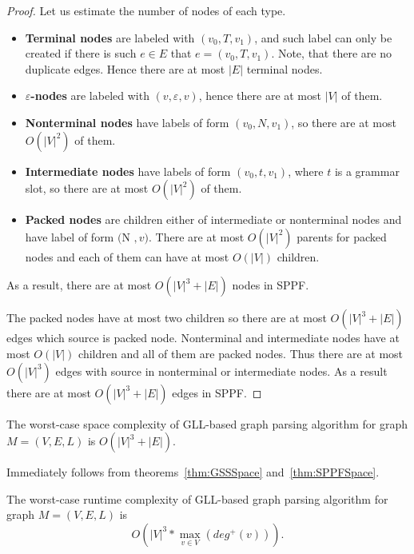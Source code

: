 \begin{proof}
Let us estimate the number of nodes of each type.
\begin{itemize}
\item \textbf{Terminal nodes} are labeled with $(v_0, T, v_1)$, and such label can only be created if there is such $e \in E$ that $e=(v_0, T,v_1)$. 
Note, that there are no duplicate edges. 
Hence there are at most $|E|$ terminal nodes.
\item \textbf{$\varepsilon$-nodes} are labeled with $(v, \varepsilon, v)$, hence there are at most $|V|$ of them. 
\item \textbf{Nonterminal nodes} have labels of form $(v_0, N, v_1)$, so there are at most $O(|V|^2)$ of them.
\item \textbf{Intermediate nodes} have labels of form $(v_0, t, v_1)$, where $t$ is a grammar slot, so there are at most $O(|V|^2)$ of them.
\item \textbf{Packed nodes} are children either of intermediate or nonterminal nodes and have label of form $($N \rightarrow \alpha \cdot \beta$, v)$.
There are at most $O(|V|^2)$ parents for packed nodes and each of them can have at most $O(|V|)$ children.
\end{itemize}

As a result, there are at most $O(|V|^3 + |E|)$ nodes in SPPF.

The packed nodes have at most two children so there are at most $O(|V|^3 + |E|)$ edges which source is packed node. 
Nonterminal and intermediate nodes have at most $O(|V|)$ children and all of them are packed nodes.
Thus there are at most $O(|V|^3)$ edges with source in nonterminal or intermediate nodes. As a result there are at most $O(|V|^3 + |E|)$ edges in SPPF.


\end{proof}

\begin{mytheorem}
The worst-case space complexity of GLL-based graph parsing algorithm for graph $M=(V,E,L)$ is $O(|V|^3 + |E|)$.
\end{mytheorem}


Immediately follows from theorems~\ref{thm:GSSSpace} and~\ref{thm:SPPFSpace}. 



\begin{mytheorem}\label{thm:complexity}
The worst-case runtime complexity of GLL-based graph parsing algorithm for graph $M=(V,E,L)$ is $$O\left(|V|^3*\max\limits_{v \in V}\left(deg^+\left(v\right)\right)\right).$$
\end{mytheorem}

